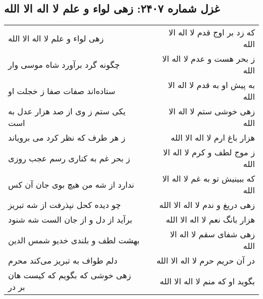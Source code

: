 \begin{center}
\section*{غزل شماره ۲۴۰۷: زهی لواء و علم لا اله الا الله}
\label{sec:2407}
\begin{longtable}{l p{0.5cm} r}
زهی لواء و علم لا اله الا الله
&&
که زد بر اوج قدم لا اله الا الله
\\
چگونه گرد برآورد شاه موسی وار
&&
ز بحر هست و عدم لا اله الا الله
\\
ستاده‌اند صفات صفا ز خجلت او
&&
به پیش او به قدم لا اله الا الله
\\
یکی ستم ز وی از صد هزار عدل به است
&&
زهی خوشی ستم لا اله الا الله
\\
ز هر طرف که نظر کرد می برویاند
&&
هزار باغ ارم لا اله الا الله
\\
ز بحر غم به کناری رسم عجب روزی
&&
ز موج لطف و کرم لا اله الا الله
\\
ندارد از شه من هیچ بوی جان آن کس
&&
که ببینیش تو به غم لا اله الا الله
\\
چو دیده کحل نپذرفت از شه تبریز
&&
زهی دریغ و ندم لا اله الا الله
\\
برآید از دل و از جان الست شه شنود
&&
هزار بانگ نعم لا اله الا الله
\\
بهشت لطف و بلندی خدیو شمس الدین
&&
زهی شفای سقم لا اله الا الله
\\
دلم طواف به تبریز می‌کند محرم
&&
در آن حریم حرم لا اله الا الله
\\
زهی خوشی که بگویم که کیست هان بر در
&&
بگوید او که منم لا اله الا الله
\\
\end{longtable}
\end{center}
